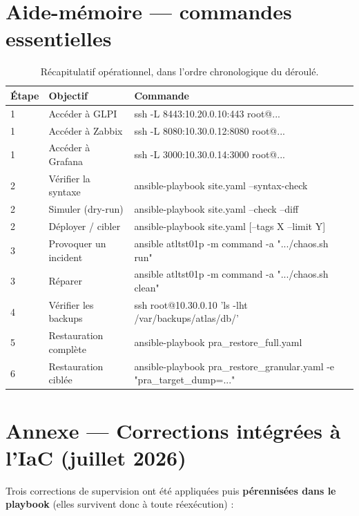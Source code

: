 \documentclass[11pt,a4paper]{article}
\newcommand{\cmd}[1]{{\ttfamily #1}}
\begin{document}
\section{Aide-mémoire — commandes essentielles}
\begin{table}[h]
\centering\small
\renewcommand{\arraystretch}{1.25}
\begin{tabularx}{\linewidth}{@{}l X l@{}}
\toprule
\textbf{Étape} & \textbf{Objectif} & \textbf{Commande} \\
\midrule
1 & Accéder à GLPI        & \cmd{ssh -L 8443:10.20.0.10:443 root@...} \\
1 & Accéder à Zabbix      & \cmd{ssh -L 8080:10.30.0.12:8080 root@...} \\
1 & Accéder à Grafana     & \cmd{ssh -L 3000:10.30.0.14:3000 root@...} \\
2 & Vérifier la syntaxe   & \cmd{ansible-playbook site.yaml --syntax-check} \\
2 & Simuler (dry-run)     & \cmd{ansible-playbook site.yaml --check --diff} \\
2 & Déployer / cibler     & \cmd{ansible-playbook site.yaml [--tags X --limit Y]} \\
3 & Provoquer un incident & \cmd{ansible atltst01p -m command -a ".../chaos.sh run"} \\
3 & Réparer               & \cmd{ansible atltst01p -m command -a ".../chaos.sh clean"} \\
4 & Vérifier les backups  & \cmd{ssh root@10.30.0.10 'ls -lht /var/backups/atlas/db/'} \\
5 & Restauration complète & \cmd{ansible-playbook pra_restore_full.yaml} \\
6 & Restauration ciblée   & \cmd{ansible-playbook pra_restore_granular.yaml -e "pra_target_dump=..."} \\
\bottomrule
\end{tabularx}
\caption{Récapitulatif opérationnel, dans l'ordre chronologique du déroulé.}
\end{table}

\section{Annexe — Corrections intégrées à l'IaC (juillet 2026)}
Trois corrections de supervision ont été appliquées puis \textbf{pérennisées dans le
playbook} (elles survivent donc à toute réexécution) :
\end{document}
